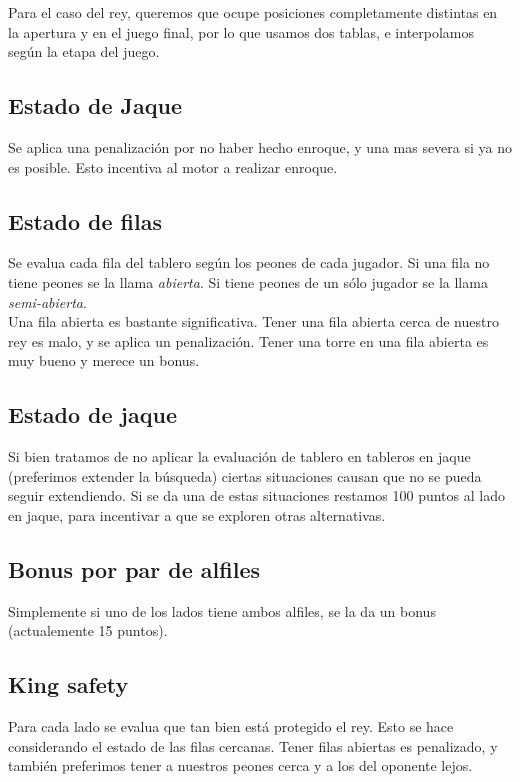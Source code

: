 \documentclass{article}
\begin{document}
Para el caso del rey, queremos que ocupe posiciones completamente
distintas en la apertura y en el juego final, por lo que usamos dos
tablas, e interpolamos según la etapa del juego.

\subsection{Estado de Jaque}
Se aplica una penalización por no haber hecho enroque, y una mas severa
si ya no es posible. Esto incentiva al motor a realizar enroque.

\subsection{Estado de filas}
Se evalua cada fila del tablero según los peones de cada jugador. Si una fila no tiene peones se la llama \emph{abierta}. Si tiene peones de un sólo jugador se la llama \emph{semi-abierta}.
\\

Una fila abierta es bastante significativa. Tener una fila abierta cerca
de nuestro rey es malo, y se aplica un penalización. Tener una torre en
una fila abierta es muy bueno y merece un bonus.

\subsection{Estado de jaque}
Si bien tratamos de no aplicar la evaluación de tablero en tableros
en jaque (preferimos extender la búsqueda) ciertas situaciones causan
que no se pueda seguir extendiendo. Si se da una de estas situaciones
restamos 100 puntos al lado en jaque, para incentivar a que se exploren
otras alternativas.

\subsection{Bonus por par de alfiles}
Simplemente si uno de los lados tiene ambos alfiles, se la da un bonus
(actualemente 15 puntos).

\subsection{King safety}
Para cada lado se evalua que tan bien está protegido el rey. Esto se
hace considerando el estado de las filas cercanas. Tener filas abiertas
es penalizado, y también preferimos tener a nuestros peones cerca y a
los del oponente lejos.
\\
\end{document}

